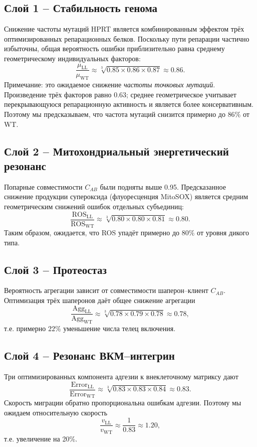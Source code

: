 \documentclass[12pt,a4paper]{article}
\begin{document}
	\subsection{Слой 1 – Стабильность генома}
	Снижение частоты мутаций HPRT является комбинированным эффектом трёх оптимизированных репарационных белков. Поскольку пути репарации частично избыточны, общая вероятность ошибки приблизительно равна среднему геометрическому индивидуальных факторов:
	\[
	\frac{\mu_{\mathrm{LL}}}{\mu_{\mathrm{WT}}} \approx \sqrt[3]{0.85 \times 0.86 \times 0.87} \approx 0.86.
	\]
	Примечание: это ожидаемое снижение \emph{частоты точковых мутаций}. Произведение трёх факторов равно \(0.63\); среднее геометрическое учитывает перекрывающуюся репарационную активность и является более консервативным. Поэтому мы предсказываем, что частота мутаций снизится примерно до \(86\%\) от WT.
	
	\subsection{Слой 2 – Митохондриальный энергетический резонанс}
	Попарные совместимости \(C_{AB}\) были подняты выше 0.95. Предсказанное снижение продукции супероксида (флуоресценция MitoSOX) является средним геометрическим снижений ошибок отдельных субъединиц:
	\[
	\frac{\mathrm{ROS}_{\mathrm{LL}}}{\mathrm{ROS}_{\mathrm{WT}}} \approx \sqrt[3]{0.80 \times 0.80 \times 0.81} \approx 0.80.
	\]
	Таким образом, ожидается, что ROS упадёт примерно до \(80\%\) от уровня дикого типа.
	
	\subsection{Слой 3 – Протеостаз}
	Вероятность агрегации зависит от совместимости шаперон–клиент \(C_{AB}\). Оптимизация трёх шаперонов даёт общее снижение агрегации
	\[
	\frac{\mathrm{Agg}_{\mathrm{LL}}}{\mathrm{Agg}_{\mathrm{WT}}} \approx \sqrt[3]{0.78 \times 0.79 \times 0.78} \approx 0.78,
	\]
	т.е. примерно \(22\%\) уменьшение числа телец включения.
	
	\subsection{Слой 4 – Резонанс ВКМ–интегрин}
	Три оптимизированных компонента адгезии к внеклеточному матриксу дают
	\[
	\frac{\mathrm{Error}_{\mathrm{LL}}}{\mathrm{Error}_{\mathrm{WT}}} \approx \sqrt[3]{0.83 \times 0.83 \times 0.84} \approx 0.83.
	\]
	Скорость миграции обратно пропорциональна ошибкам адгезии. Поэтому мы ожидаем относительную скорость
	\[
	\frac{v_{\mathrm{LL}}}{v_{\mathrm{WT}}} \approx \frac{1}{0.83} \approx 1.20,
	\]
	т.е. увеличение на 20\%.
	
\end{document}
